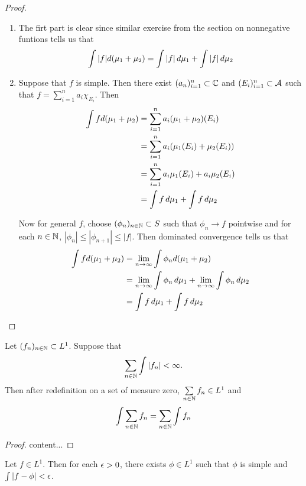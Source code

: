 \documentclass{book}
\begin{document}
	\begin{proof}
		\begin{enumerate}
			\item The firt part is clear since similar exercise from the section on nonnegative funtions tells us that $$\int |f| d(\mu_1 + \mu_2) = \int |f| \, d \mu_1 + \int |f| \, d \mu_2$$
			
			
			\item Suppose that $f$ is simple. Then there exist $(a_n)_{i=1}^n \subset \mathbb{C}$ and $(E_i)_{i=1}^n \subset \mathcal{A}$ such that $f = \sum\limits_{i =1}^n a_i \chi_{E_i}$. Then 
			\begin{align*}
				\int f d(\mu_1 + \mu_2) 
				&= \sum\limits_{i =1}^n a_i (\mu_1 + \mu_2)(E_i)\\
				&= \sum\limits_{i =1}^n a_i (\mu_1(E_i) + \mu_2(E_i))\\
				&= \sum\limits_{i =1}^n a_i \mu_1(E_i) + a_i \mu_2(E_i)\\
				&= \int f \, d \mu_1 + \int f \, d \mu_2
			\end{align*}
			
			Now for general $f$, choose $(\phi_n)_{n \in \mathbb{N}} \subset S$ such that $\phi_n \rightarrow f$ pointwise and for each $n \in \mathbb{N}$, $|\phi_n| \leq |\phi_{n+1}| \leq |f|$. Then dominated convergence tells us that 
			\begin{align*}
				\int f d(\mu_1 + \mu_2) 
				&= \lim \limits_{n \rightarrow \infty} \int \phi_n d(\mu_1 + \mu_2)\\
				&= \lim \limits_{n \rightarrow \infty} \int \phi_n \, d \mu_1 + \lim \limits_{n \rightarrow \infty} \int \phi_n \, d \mu_2 \\
				&= \int f \, d \mu_1 + \int f \, d \mu_2
			\end{align*}
		\end{enumerate}
	\end{proof}
	
	\begin{ex} 
		Let $(f_n)_{n \in \mathbb{N}} \subset L^1$. Suppose that $$\sum\limits_{n \in \mathbb{N}} \int |f_n| < \infty.$$ Then after redefinition on a set of measure zero, $\sum\limits_{n \in \mathbb{N}}f_n \in L^1$ and $$\int \sum\limits_{n \in \mathbb{N}}f_n = \sum\limits_{n \in \mathbb{N}} \int f_n$$
	\end{ex}

	\begin{proof}
		content...
	\end{proof}
	
	\begin{ex} 
		Let $f \in L^1$. Then for each $\epsilon > 0$, there exists $\phi \in L^1$ such that $\phi$ is simple and $\int |f - \phi| < \epsilon$.  
	\end{ex}
\end{document}
